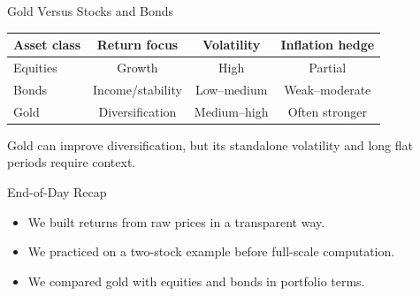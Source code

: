 \documentclass[aspectratio=169]{beamer}
\begin{document}
\begin{frame}{Gold Versus Stocks and Bonds}
\begin{tabular}{lccc}
\toprule
Asset class & Return focus & Volatility & Inflation hedge \\
\midrule
Equities & Growth & High & Partial \\
Bonds & Income/stability & Low--medium & Weak--moderate \\
Gold & Diversification & Medium--high & Often stronger \\
\bottomrule
\end{tabular}

\vspace{0.75em}
\begin{takeawayblock}
Gold can improve diversification, but its standalone volatility and long flat periods require context.
\end{takeawayblock}
\end{frame}

\begin{frame}{End-of-Day Recap}
\begin{itemize}
  \item We built returns from raw prices in a transparent way.
  \item We practiced on a two-stock example before full-scale computation.
  \item We compared gold with equities and bonds in portfolio terms.
\end{itemize}
\end{frame}
\end{document}
